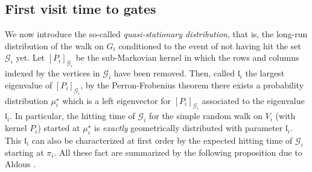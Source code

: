 \documentclass[11pt,oneside]{amsart}
\numberwithin{equation}{section}  %
\theoremstyle{plain}
\newcommand{\gates}{\mathcal{G}}
\newcommand{\muqs}{\mu^\star_i}
\begin{document}
\subsection{First visit time to gates}\label{suse:quasi-stationary}
We now introduce the so-called \emph{quasi-stationary distribution}, that is, the long-run distribution of the walk on $G_i$ conditioned to the event of not having hit the set $\gates_i$ yet. Let $[P_i]_{\gates_i}$ be the sub-Markovian kernel in which the rows and columns indexed by the vertices in $\gates_i$ have been removed. Then, called $\mathfrak{l}_i$ the largest eigenvalue of $[P_i]_{\gates_i}$, by the Perron-Frobenius theorem there exists a probability distribution $\muqs$ which is a left eigenvector for $[P_i]_{\gates_i}$ associated to the eigenvalue $\mathfrak{l}_i$. In particular, the hitting time of $\gates_i$ for the simple random walk on $V_i$ (with kernel $P_i$) started at $\muqs$ is \emph{exactly} geometrically distributed with parameter $\mathfrak{l}_i$. This $\mathfrak{l}_i$ can also be characterized at first order by the expected hitting time of $\gates_i$ starting at $\pi_i$. All these fact are summarized by the following proposition due to Aldous \cite{A82}.
\end{document}
